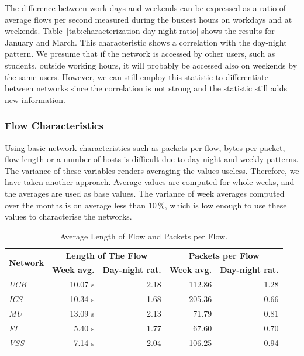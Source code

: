 The difference between work days and weekends can be expressed as a ratio of average flows per second measured during the busiest hours on workdays and at weekends. Table~\ref{tab:characterization-day-night-ratio} shows the results for January and March. This characteristic shows a correlation with the day-night pattern. 
We presume that if the network is accessed by other users, such as students, outside working hours, it will probably be accessed also on weekends by the same users.
However, we can still employ this statistic to differentiate between networks since the correlation is not strong and the statistic still adds new information.

\subsubsection{Flow Characteristics}

Using basic network characteristics such as packets per flow, bytes per packet, flow length or a number of hosts is difficult due to day-night and weekly patterns. The variance of these variables renders averaging the values useless. Therefore, we have taken another approach. Average values are computed for whole weeks, and the averages are used as base values. The variance of week averages computed over the months is on average less than 10\,\%, which is low enough to use these values to characterise the networks. 

\begin{table}[!t]
        \centering
        \renewcommand{\arraystretch}{1.1}
        \setlength{\tabcolsep}{5pt}
        \begin{tabular}{|l|r|r|r|r|} \hline
                \multirow{2}{*}{\centering\textbf{Network}} & \multicolumn{2}{c|}{\textbf{Length of The Flow}} & \multicolumn{2}{c|}{\textbf{Packets per Flow}} \\ \cline{2-5}
                  & \textbf{Week avg.} & \textbf{Day-night rat.} & \textbf{Week avg.} & \textbf{Day-night rat.} \\ \hline
                \textit{UCB} &  10.07 s & 2.18 &  112.86 & 1.28 \\ \hline
                \textit{ICS} & 10.34 s & 1.68 & 205.36 &  0.66 \\  \hline
                \textit{MU} & 13.09 s & 2.13 & 71.79  & 0.81 \\  \hline
                \textit{FI} & 5.40 s & 1.77 & 67.60 & 0.70 \\  \hline
                \textit{VSS} & 7.14 s & 2.04 & 106.25 & 0.94 \\  \hline
        \end{tabular}
        \caption{Average Length of Flow and Packets per Flow.}
        \label{tab:characterization-avg-lengths}
\end{table}

